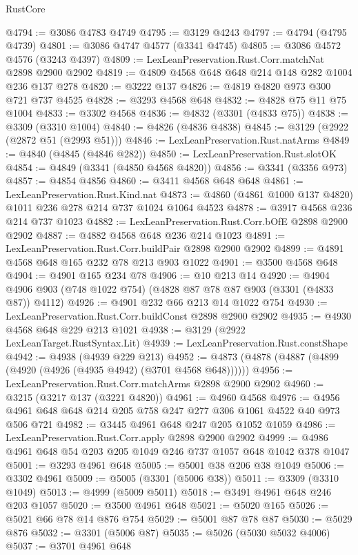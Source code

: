 \begin{lexlean}{RustCore}
\begin{coremodule}
@4794 := @3086 @4783 @4749
@4795 := @3129 @4243
@4797 := @4794 (@4795 @4739)
@4801 := @3086 @4747 @4577 (@3341 @4745)
@4805 := @3086 @4572 @4576 (@3243 @4397)
@4809 := LexLeanPreservation.Rust.Corr.matchNat @2898 @2900 @2902
@4819 := @4809 @4568 @648 @648 @214 @148 @282 @1004 @236 @137 @278
@4820 := @3222 @137
@4826 := @4819 @4820 @973 @300 @721 @737 @4525
@4828 := @3293 @4568 @648
@4832 := @4828 @75 @11 @75 @1004
@4833 := @3302 @4568
@4836 := @4832 (@3301 (@4833 @75))
@4838 := @3309 (@3310 @1004)
@4840 := @4826 (@4836 @4838)
@4845 := @3129 (@2922 (@2872 @51 (@2993 @51)))
@4846 := LexLeanPreservation.Rust.natArms
@4849 := @4840 (@4845 (@4846 @282))
@4850 := LexLeanPreservation.Rust.slotOK
@4854 := @4849 (@3341 (@4850 @4568 @4820))
@4856 := @3341 (@3356 @973)
@4857 := @4854 @4856
@4860 := @3411 @4568 @648 @648
@4861 := LexLeanPreservation.Rust.Kind.nat
@4873 := @4860 (@4861 @1000 @137 @4820) @1011 @236 @278 @214 @737 @1024 @1064 @4523
@4878 := @3917 @4568 @236 @214 @737 @1023
@4882 := LexLeanPreservation.Rust.Corr.bOfE @2898 @2900 @2902
@4887 := @4882 @4568 @648 @236 @214 @1023
@4891 := LexLeanPreservation.Rust.Corr.buildPair @2898 @2900 @2902
@4899 := @4891 @4568 @648 @165 @232 @78 @213 @903 @1022
@4901 := @3500 @4568 @648
@4904 := @4901 @165 @234 @78
@4906 := @10 @213 @14
@4920 := @4904 @4906 @903 (@748 @1022 @754) (@4828 @87 @78 @87 @903 (@3301 (@4833 @87)) @4112)
@4926 := @4901 @232 @66 @213 @14 @1022 @754
@4930 := LexLeanPreservation.Rust.Corr.buildConst @2898 @2900 @2902
@4935 := @4930 @4568 @648 @229 @213 @1021
@4938 := @3129 (@2922 LexLeanTarget.RustSyntax.Lit)
@4939 := LexLeanPreservation.Rust.constShape
@4942 := @4938 (@4939 @229 @213)
@4952 := @4873 (@4878 (@4887 (@4899 (@4920 (@4926 (@4935 @4942) (@3701 @4568 @648))))))
@4956 := LexLeanPreservation.Rust.Corr.matchArms @2898 @2900 @2902
@4960 := @3215 (@3217 @137 (@3221 @4820))
@4961 := @4960 @4568
@4976 := @4956 @4961 @648 @648 @214 @205 @758 @247 @277 @306 @1061 @4522 @40 @973 @506 @721
@4982 := @3445 @4961 @648 @247 @205 @1052 @1059
@4986 := LexLeanPreservation.Rust.Corr.apply @2898 @2900 @2902
@4999 := @4986 @4961 @648 @54 @203 @205 @1049 @246 @737 @1057 @648 @1042 @378 @1047
@5001 := @3293 @4961 @648
@5005 := @5001 @38 @206 @38 @1049
@5006 := @3302 @4961
@5009 := @5005 (@3301 (@5006 @38))
@5011 := @3309 (@3310 @1049)
@5013 := @4999 (@5009 @5011)
@5018 := @3491 @4961 @648 @246 @203 @1057
@5020 := @3500 @4961 @648
@5021 := @5020 @165
@5026 := @5021 @66 @78 @14 @876 @754
@5029 := @5001 @87 @78 @87
@5030 := @5029 @876
@5032 := @3301 (@5006 @87)
@5035 := @5026 (@5030 @5032 @4006)
@5037 := @3701 @4961 @648

\end{coremodule}
\end{lexlean}
